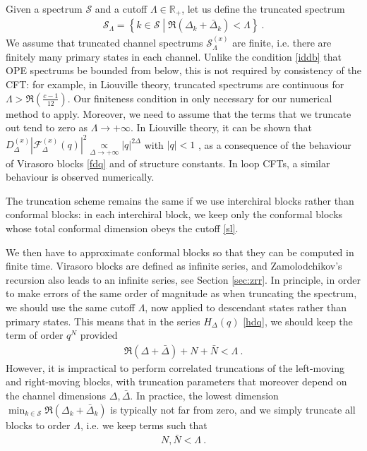 \documentclass[12pt, a4paper]{article}
\begin{document}
Given a spectrum $\mathcal{S}$ and a cutoff $\Lambda \in \mathbb{R}_+$, let us define the truncated spectrum  
\begin{align}
 \mathcal{S}_\Lambda = \left\{ k\in \mathcal{S}\middle| \Re\left(\Delta_k+\bar\Delta_k\right)<\Lambda \right\} \ . 
 \label{sl}
\end{align}
We assume that truncated channel spectrums $\mathcal{S}^{(x)}_\Lambda$ are finite, i.e. there are finitely many primary states in each channel. Unlike the condition \eqref{iddb} that OPE spectrums be bounded from below, this is not required by consistency of the CFT: for example, in Liouville theory, truncated spectrums are continuous for $\Lambda>\Re\left(\frac{c-1}{12}\right)$. Our finiteness condition in only necessary for our numerical method to apply. Moreover, we need to assume that the terms that we truncate out tend to zero as $\Lambda\to +\infty$. In Liouville theory, it can be shown that $D^{(x)}_\Delta \left|\mathcal{F}^{(x)}_\Delta(q)\right|^2 \underset{\Delta\to+\infty}{\propto} |q|^{2\Delta}$ with $|q|<1$ \cite{rs15}, as a consequence of the behaviour of Virasoro blocks \eqref{fdq} and of structure constants. In loop CFTs, a similar behaviour is observed numerically.

The truncation scheme remains the same if we use interchiral blocks rather than conformal blocks: in each interchiral block, we keep only the conformal blocks whose total conformal dimension obeys the cutoff \eqref{sl}. 

We then have to approximate conformal blocks so that they can be computed in finite time. Virasoro blocks are defined as infinite series, and Zamolodchikov's recursion also leads to an infinite series, see Section \ref{sec:zrr}. In principle, in order to make errors of the same order of magnitude as when truncating the spectrum, we should use the same cutoff $\Lambda$, now applied to descendant states rather than primary states. This means that in the series $H_\Delta(q)$ \eqref{hdq}, we should keep the term of order $q^N$ provided 
\begin{align}
 \Re\left(\Delta +\bar\Delta\right) + N + \bar N <\Lambda\ . 
\end{align}
However, it is impractical to perform correlated truncations of the left-moving and right-moving blocks, with truncation parameters that moreover depend on the channel dimensions $\Delta,\bar\Delta$. In practice, the lowest dimension $\min_{k\in\mathcal{S}}\Re\left(\Delta_k+\bar\Delta_k\right)$ is typically not far from zero, and we simply truncate all blocks to order $\Lambda$, i.e. we keep terms such that 
\begin{align}
 N,\bar N < \Lambda \ . 
\end{align}
\end{document}
